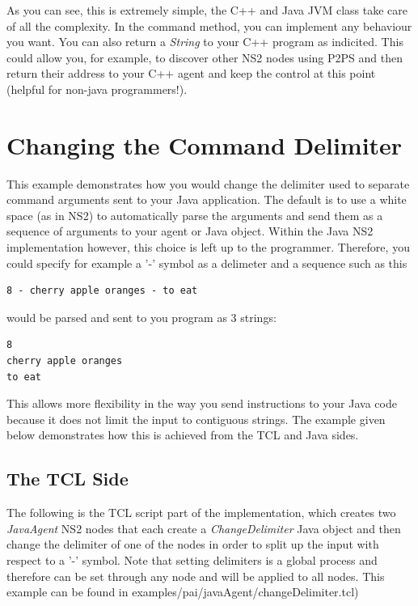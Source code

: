 As you can see, this is extremely simple, the C++ and Java JVM class take care of all
the complexity. In the command method, you can implement any behaviour you
want. You can also return a \emph{String} to your C++ 
program as indicited. This could allow you, for example, to discover other 
NS2 nodes using P2PS and then return their
address to your C++ agent and keep the control at this point (helpful for 
non-java programmers!).


\section{Changing the Command Delimiter }
\label{jni:delimiter}

This example demonstrates how you would change the delimiter used
to separate command arguments sent to your Java application.   
The default is to use a white space (as in NS2) to automatically 
parse the arguments and send them as a sequence of arguments
to your agent or Java object.  Within the Java NS2 implementation
however, this choice is left up to the programmer.  Therefore,
you could specify for example a '-' symbol as a delimeter and
a sequence such as this

\begin{verbatim}
8 - cherry apple oranges - to eat
\end{verbatim}

\noindent would be parsed and sent to you program as 3 strings:

\begin{verbatim}
8
cherry apple oranges
to eat
\end{verbatim}

This allows more flexibility in the way you send instructions to your Java
code because it does not limit the input to contiguous strings. The example
given below demonstrates how this is achieved from the TCL and Java 
sides.

\subsection{The TCL Side}
\label{jni:tclside}

The following is the TCL script part of the implementation, which creates two 
\emph{JavaAgent} NS2 nodes that each create a \emph{ChangeDelimiter} 
Java object and then change the delimiter of one of the nodes in order
to split up the input with respect to a '-' symbol.   Note that setting
delimiters is a global process and therefore can be set through 
any node and will be applied to all nodes. This
example can be found in examples/pai/javaAgent/changeDelimiter.tcl)

